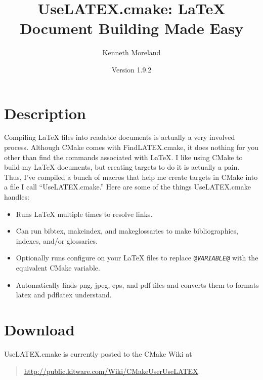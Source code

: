 \documentclass{article}
\newcommand{\UseLATEXVersion}{1.9.2}
\newcommand*{\textfile}[1]{\textsf{#1}}
\newcommand*{\textprog}[1]{\textfile{#1}}
\newcommand*{\textcmake}[1]{\texttt{#1}}
\newcommand*{\textvar}[1]{\textit{#1}}
\newcommand*{\UseLATEX}{\textfile{UseLATEX.cmake}\xspace}
\newcommand*{\latex}{\LaTeX\xspace}
\begin{document}
  \sloppy

  \title{UseLATEX.cmake: \latex Document Building Made Easy}
  \author{Kenneth Moreland}
  \date{Version \UseLATEXVersion}
  \maketitle

  \tableofcontents


  \section{Description}
  \label{sec:Description}

  Compiling \latex files into readable documents is actually a very
  involved process. Although CMake comes with \textfile{FindLATEX.cmake},
  it does nothing for you other than find the commands associated with
  \latex. I like using CMake to build my \latex documents, but creating
  targets to do it is actually a pain. Thus, I've compiled a bunch of
  macros that help me create targets in CMake into a file I call
  ``\UseLATEX.'' Here are some of the things \UseLATEX handles:

  \begin{itemize}
  \item Runs \latex multiple times to resolve links. 
  \item Can run \textprog{bibtex}, \textprog{makeindex}, and
    \textprog{makeglossaries} to make bibliographies, indexes, and/or
    glossaries.
  \item Optionally runs configure on your \latex files to replace
    \textcmake{@\textvar{VARIABLE}@} with the equivalent CMake variable.
  \item Automatically finds png, jpeg, eps, and pdf files and converts them
    to formats \textprog{latex} and \textprog{pdflatex} understand.
  \end{itemize}


  \section{Download}
  \label{sec:Download}

  \UseLATEX is currently posted to the CMake Wiki at
  \begin{quote}
    \href{http://public.kitware.com/Wiki/CMakeUserUseLATEX}{http://public.kitware.com/Wiki/CMakeUserUseLATEX}.
  \end{quote}
\end{document}
